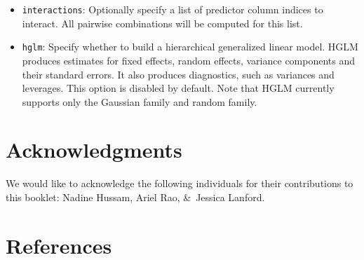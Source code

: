 \begin{itemize}
\item \texttt{interactions}: Optionally specify a list of predictor column indices to interact. All pairwise combinations will be computed for this list.
\item \texttt{hglm}: Specify whether to build a hierarchical generalized linear model. HGLM produces estimates for fixed effects, random effects, variance components and their standard errors. It also produces diagnostics, such as variances and leverages. This option is disabled by default. Note that HGLM currently supports only the Gaussian family and random family.
\end{itemize}

\section{Acknowledgments}
We would like to acknowledge the following individuals for their contributions to this booklet: Nadine Hussam, Ariel Rao, \&\ Jessica Lanford.

\section{References}
  















